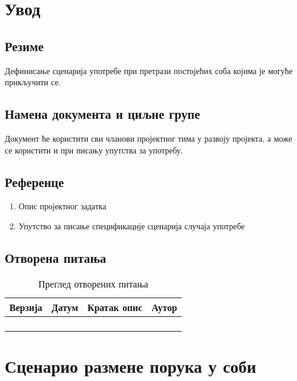 \section{Увод}

\subsection{Резиме}
Дефинисање сценарија употребе при претрази постојећих соба којима је могуће прикључити се.

\subsection{Намена документа и циљне групе}
Документ ће користити сви чланови пројектног тима у развоју пројекта, а може се 
користити и при писању упутства за употребу.

\subsection{Референце}
\begin{enumerate}
	\item Опис пројектног задатка
	\item Упутство за писање спецификације сценарија случаја употребе
\end{enumerate}

\subsection{Отворена питања}
\begin{table}[h!]
\centering
	
	\begin{tabu}{ || X[l] | X[l] | X[l] | X[l] || }
	\hline
	\textbf{Верзија} & \textbf{Датум} & \textbf{Кратак опис} & \textbf{Аутор} \\
	\hline
	\hline
	& & &\\ 
	\hline
	& & &\\
	\hline
	& & &\\
	\hline
	& & &\\
	\hline
	\end{tabu}
	\caption{Преглед отворених питања}
	\label{table:2}
		
\end{table}



\section{Сценарио размене порука у соби}

